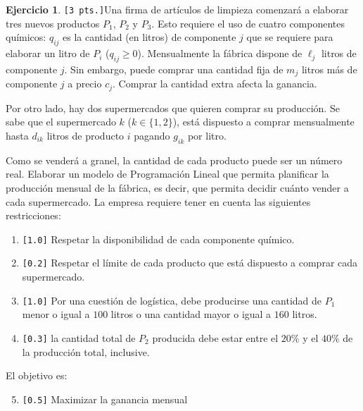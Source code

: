\documentclass[a4paper,oneside,12pt]{amsart}
\theoremstyle{definition}
\newtheorem{quest}{Ejercicio}
\begin{document}
\begin{quest} 
\verb|[3 pts.]|Una firma de artículos de limpieza comenzará a elaborar tres nuevos productos  $P_1$, $P_2$ y $P_3$. Esto requiere el uso de cuatro componentes químicos: $q_{ij}$ es la cantidad (en litros) de componente $j$ que se requiere para elaborar un litro de $P_i$ ($q_{ij}\geq 0$). Mensualmente la fábrica dispone de $\ell_j$ litros de componente $j$. Sin embargo, puede comprar una cantidad fija de $m_j$ litros más de componente $j$ a precio $c_j$. Comprar la cantidad extra afecta la ganancia.

Por otro lado, hay dos supermercados que quieren comprar su producción. Se sabe que el supermercado $k$ ($k\in\{1,2\}$), está dispuesto a comprar mensualmente hasta $d_{ik}$ litros de producto $i$ pagando $g_{ik}$ por litro.

Como se venderá a granel, la cantidad de cada producto puede ser un número real. Elaborar un modelo de Programación Lineal que permita planificar la producción mensual de la fábrica, es decir, que permita decidir cuánto vender a cada supermercado. La empresa requiere tener en cuenta las siguientes restricciones:
\begin{enumerate}
    \item \verb|[1.0]| Respetar la disponibilidad de cada componente químico.
    \item \verb|[0.2]| Respetar el límite de cada producto que está dispuesto a comprar cada supermercado.
    \item \verb|[1.0]| Por una cuestión de logística, debe producirse una cantidad de $P_1$ menor o igual a $100$ litros o una cantidad mayor o igual a $160$ litros.
    \item \verb|[0.3]| la cantidad total de $P_2$ producida debe estar entre el $20\%$ y el $40\%$ de la producción total, inclusive.
\end{enumerate}
El objetivo es:
\begin{enumerate}
    \setcounter{enumi}{4}
    \item \verb|[0.5]| Maximizar la ganancia mensual
\end{enumerate}

\end{quest}


\end{document}
